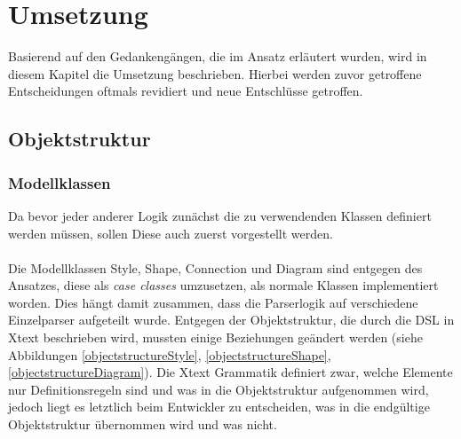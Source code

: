 \chapter{Umsetzung}
Basierend auf den Gedankengängen, die im Ansatz erläutert wurden, wird in diesem Kapitel die Umsetzung beschrieben. Hierbei werden zuvor getroffene Entscheidungen oftmals revidiert und neue Entschlüsse getroffen.
\section{Objektstruktur}
\subsection{Modellklassen}
Da bevor jeder anderer Logik zunächst die zu verwendenden Klassen definiert werden müssen, sollen Diese auch zuerst vorgestellt werden.\\\\Die Modellklassen Style, Shape, Connection und Diagram sind entgegen des Ansatzes, diese als \textit{case classes} umzusetzen, als normale Klassen implementiert worden. Dies hängt damit zusammen, dass die Parserlogik auf verschiedene Einzelparser aufgeteilt wurde.
Entgegen der Objektstruktur, die durch die DSL in Xtext beschrieben wird, mussten einige Beziehungen geändert werden (siehe Abbildungen \ref{objectstructureStyle}, \ref{objectstructureShape}, \ref{objectstructureDiagram}).
Die Xtext Grammatik definiert zwar, welche Elemente nur Definitionsregeln sind und was in die Objektstruktur aufgenommen wird, jedoch liegt es letztlich beim Entwickler zu entscheiden, was in die endgültige Objektstruktur übernommen wird und was nicht.

